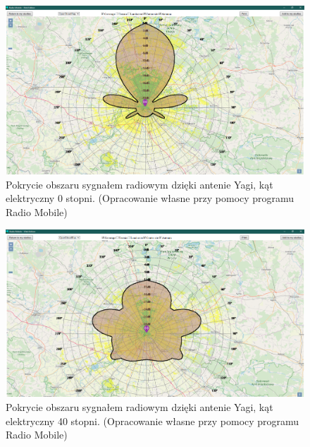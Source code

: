 		\begin{figure}[h!]
			\centering
			\includegraphics[scale=0.5]{Obrazki/Antenna_Yagi_Angle_0.png}
			\caption{Pokrycie obszaru sygnałem radiowym dzięki antenie Yagi, kąt elektryczny 0 stopni.
				\newline(Opracowanie własne przy pomocy programu Radio Mobile)}
			\label{fig:Obrazek_KatNachyleniaAnteny_0_Stopni}
		\end{figure}

		\begin{figure}[h!]
			\centering
			\includegraphics[scale=0.5]{Obrazki/Antenna_Yagi_Angle_40.png}
			\caption{Pokrycie obszaru sygnałem radiowym dzięki antenie Yagi, kąt elektryczny 40 stopni.
				\newline(Opracowanie własne przy pomocy programu Radio Mobile)}
			\label{fig:Obrazek_KatNachyleniaAnteny_40_Stopni}
		\end{figure}
